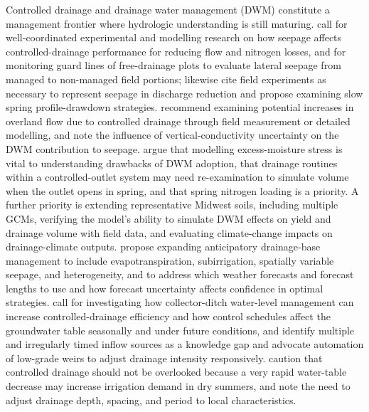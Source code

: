 Controlled drainage and drainage water management (DWM) constitute a
management frontier where hydrologic understanding is still maturing.
\textcite{Youssef2021} call for well-coordinated experimental and modelling
research on how seepage affects controlled-drainage performance for reducing
flow and nitrogen losses, and for monitoring guard lines of free-drainage plots
to evaluate lateral seepage from managed to non-managed field portions;
\textcite{Pease2017} likewise cite field experiments as necessary to represent
seepage in discharge reduction and propose examining slow spring
profile-drawdown strategies. \textcite{Lahdou2019} recommend examining
potential increases in overland flow due to controlled drainage through field
measurement or detailed modelling, and \textcite{Ale2009} note the influence of
vertical-conductivity uncertainty on the DWM contribution to seepage.
\textcite{Craft2018} argue that modelling excess-moisture stress is vital to
understanding drawbacks of DWM adoption, that drainage routines within a
controlled-outlet system may need re-examination to simulate volume when the
outlet opens in spring, and that spring nitrogen loading is a priority.
A further priority is extending representative Midwest soils,
including multiple GCMs, verifying the model's ability to simulate DWM effects
on yield and drainage volume with field data, and evaluating climate-change
impacts on drainage-climate outputs. \textcite{VandeCraats2021} propose
expanding anticipatory drainage-base management to include evapotranspiration,
subirrigation, spatially variable seepage, and heterogeneity, and to address
which weather forecasts and forecast lengths to use and how forecast
uncertainty affects confidence in optimal strategies. \textcite{Salla2022}
call for investigating how collector-ditch water-level management can increase
controlled-drainage efficiency and how control schedules affect the
groundwater table seasonally and under future conditions, and
\textcite{Strock2025b} identify multiple and irregularly timed inflow sources
as a knowledge gap and advocate automation of low-grade weirs to adjust
drainage intensity responsively. \textcite{Güngör2023} caution that
controlled drainage should not be overlooked because a very rapid water-table
decrease may increase irrigation demand in dry summers, and
\textcite{Dou2023} note the need to adjust drainage depth, spacing, and period
to local characteristics.

